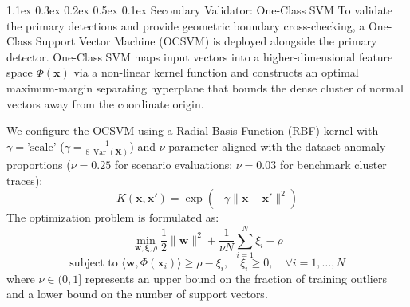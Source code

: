 \documentclass[10pt,conference]{IEEEtran}
\makeatletter
\renewcommand\subsection{\@startsection{subsection}{2}{\z@}%
  {1.1ex \@plus 0.3ex \@minus 0.2ex}%
  {0.5ex \@plus 0.1ex}%
  {\normalfont\fontsize{12pt}{14.4pt}\selectfont\bfseries}}
\makeatother
\begin{document}
\subsection{Secondary Validator: One-Class SVM}
To validate the primary detections and provide geometric boundary cross-checking, a One-Class Support Vector Machine (OCSVM) is deployed alongside the primary detector. One-Class SVM maps input vectors into a higher-dimensional feature space $\Phi(\mathbf{x})$ via a non-linear kernel function and constructs an optimal maximum-margin separating hyperplane that bounds the dense cluster of normal vectors away from the coordinate origin.

We configure the OCSVM using a Radial Basis Function (RBF) kernel with $\gamma = \text{'scale'}$ ($\gamma = \frac{1}{8\,\operatorname{Var}(\mathbf{X})}$) and $\nu$ parameter aligned with the dataset anomaly proportions ($\nu = 0.25$ for scenario evaluations; $\nu = 0.03$ for benchmark cluster traces):
\begin{equation}
K(\mathbf{x}, \mathbf{x}') = \exp\left(-\gamma \|\mathbf{x} - \mathbf{x}'\|^2\right)
\end{equation}
The optimization problem is formulated as:
\begin{equation}
\min_{\mathbf{w}, \boldsymbol{\xi}, \rho} \frac{1}{2}\|\mathbf{w}\|^2 + \frac{1}{\nu N}\sum_{i=1}^N \xi_i - \rho
\end{equation}
\begin{equation}
\text{subject to } \langle \mathbf{w}, \Phi(\mathbf{x}_i) \rangle \ge \rho - \xi_i, \quad \xi_i \ge 0, \quad \forall i=1,\dots,N
\end{equation}
where $\nu \in (0, 1]$ represents an upper bound on the fraction of training outliers and a lower bound on the number of support vectors.
\end{document}
